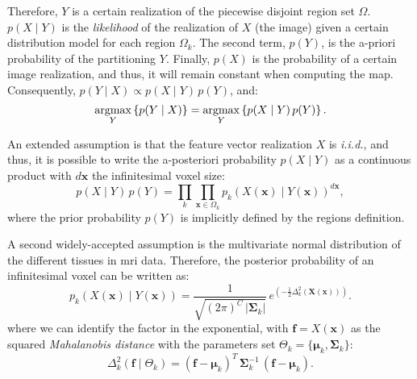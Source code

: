 Therefore, $Y$ is a certain realization of the piecewise 
disjoint region set $\Omega$. $p(X \mid Y)$ is the \emph{likelihood} of 
the realization of $X$ (the image) given a certain distribution model for 
each region $\Omega_k$. The second term, $p(Y)$, is the a-priori probability of 
the partitioning $Y$. Finally, $p(X)$ is the probability of a certain image 
realization, and thus, it will remain constant when computing the \gls{map}.
Consequently, $p(Y \mid X) \propto p(X \mid Y)\, p(Y)$, and:
\begin{equation}
\underset{Y}{\operatorname{argmax}} \left\{ p(Y \mid X) \right\} = 
\underset{Y}{\operatorname{argmax}} \left\{ p(X \mid Y)\, p(Y) \right\}.
\end{equation}


An extended assumption is that the feature vector realization $X$ is
\emph{i.i.d.}, and thus, it is possible to write the a-posteriori
probability $p(X \mid Y)$ as a continuous product with $d\mathbf{x}$ the
infinitesimal voxel size:
\begin{equation}
p(X \mid Y) \, p(Y) = \underset{k}{\prod} \underset{\mathbf{x}\in \Omega_k}{\prod}
p_k( X(\mathbf{x}) \mid Y(\mathbf{x}) )^{d\mathbf{x}},
\label{eq:bayes_aposteriori}
\end{equation}
where the prior probability $p(Y)$ is implicitly
defined by the regions definition. 


A second widely-accepted assumption is the multivariate normal 
distribution of the different tissues in \gls{mri} data. Therefore,
the posterior probability of an infinitesimal voxel
can be written as:
\begin{equation}
p_k( X(\mathbf{x}) \mid Y(\mathbf{x}) ) = \frac{1}{ \sqrt{(2\pi)^{C}\,\left|\boldsymbol{\Sigma}_{k}\right|}}\,{e^{\left(-\frac{1}{2}  \Delta^2_k (\mathbf{X(\mathbf{x})}) \right)}}.
\label{eq:bayes_mpdf}
\end{equation}
where we can identify the factor in the exponential, with 
$\mathbf{f} = X(\mathbf{x})$ as the squared \emph{Mahalanobis 
distance} with the parameters set $\Theta_k = \lbrace \boldsymbol{\mu}_k, \boldsymbol{\Sigma}_k \rbrace$:
\begin{equation}
\Delta^2_k (\mathbf{f} \mid \Theta_k ) = (\mathbf{f} - \boldsymbol{\mu}_k)^T \, \boldsymbol{\Sigma}^{-1}_k \, (\mathbf{f} - \boldsymbol{\mu}_k).
\label{eq:bayes_mahalanobis}
\end{equation}

